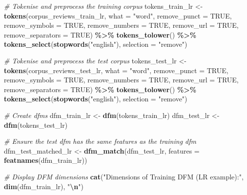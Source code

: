\documentclass[
]{book}
\newenvironment{Shaded}{\begin{snugshade}}{\end{snugshade}}
\newcommand{\AttributeTok}[1]{\textcolor[rgb]{0.13,0.29,0.53}{#1}}
\newcommand{\CommentTok}[1]{\textcolor[rgb]{0.56,0.35,0.01}{\textit{#1}}}
\newcommand{\ConstantTok}[1]{\textcolor[rgb]{0.56,0.35,0.01}{#1}}
\newcommand{\FunctionTok}[1]{\textcolor[rgb]{0.13,0.29,0.53}{\textbf{#1}}}
\newcommand{\NormalTok}[1]{#1}
\newcommand{\OtherTok}[1]{\textcolor[rgb]{0.56,0.35,0.01}{#1}}
\newcommand{\SpecialCharTok}[1]{\textcolor[rgb]{0.81,0.36,0.00}{\textbf{#1}}}
\newcommand{\StringTok}[1]{\textcolor[rgb]{0.31,0.60,0.02}{#1}}
\begin{document}
\begin{Shaded}
\begin{Highlighting}[]
\CommentTok{\# Tokenise and preprocess the training corpus}
\NormalTok{tokens\_train\_lr }\OtherTok{\textless{}{-}} \FunctionTok{tokens}\NormalTok{(corpus\_reviews\_train\_lr, }\AttributeTok{what =} \StringTok{"word"}\NormalTok{, }\AttributeTok{remove\_punct =} \ConstantTok{TRUE}\NormalTok{,}
    \AttributeTok{remove\_symbols =} \ConstantTok{TRUE}\NormalTok{, }\AttributeTok{remove\_numbers =} \ConstantTok{TRUE}\NormalTok{, }\AttributeTok{remove\_url =} \ConstantTok{TRUE}\NormalTok{, }\AttributeTok{remove\_separators =} \ConstantTok{TRUE}\NormalTok{) }\SpecialCharTok{\%\textgreater{}\%}
    \FunctionTok{tokens\_tolower}\NormalTok{() }\SpecialCharTok{\%\textgreater{}\%}
    \FunctionTok{tokens\_select}\NormalTok{(}\FunctionTok{stopwords}\NormalTok{(}\StringTok{"english"}\NormalTok{), }\AttributeTok{selection =} \StringTok{"remove"}\NormalTok{)}

\CommentTok{\# Tokenise and preprocess the test corpus}
\NormalTok{tokens\_test\_lr }\OtherTok{\textless{}{-}} \FunctionTok{tokens}\NormalTok{(corpus\_reviews\_test\_lr, }\AttributeTok{what =} \StringTok{"word"}\NormalTok{, }\AttributeTok{remove\_punct =} \ConstantTok{TRUE}\NormalTok{,}
    \AttributeTok{remove\_symbols =} \ConstantTok{TRUE}\NormalTok{, }\AttributeTok{remove\_numbers =} \ConstantTok{TRUE}\NormalTok{, }\AttributeTok{remove\_url =} \ConstantTok{TRUE}\NormalTok{, }\AttributeTok{remove\_separators =} \ConstantTok{TRUE}\NormalTok{) }\SpecialCharTok{\%\textgreater{}\%}
    \FunctionTok{tokens\_tolower}\NormalTok{() }\SpecialCharTok{\%\textgreater{}\%}
    \FunctionTok{tokens\_select}\NormalTok{(}\FunctionTok{stopwords}\NormalTok{(}\StringTok{"english"}\NormalTok{), }\AttributeTok{selection =} \StringTok{"remove"}\NormalTok{)}

\CommentTok{\# Create dfms}
\NormalTok{dfm\_train\_lr }\OtherTok{\textless{}{-}} \FunctionTok{dfm}\NormalTok{(tokens\_train\_lr)}
\NormalTok{dfm\_test\_lr }\OtherTok{\textless{}{-}} \FunctionTok{dfm}\NormalTok{(tokens\_test\_lr)}

\CommentTok{\# Ensure the test dfm has the same features as the training dfm}
\NormalTok{dfm\_test\_matched\_lr }\OtherTok{\textless{}{-}} \FunctionTok{dfm\_match}\NormalTok{(dfm\_test\_lr, }\AttributeTok{features =} \FunctionTok{featnames}\NormalTok{(dfm\_train\_lr))}

\CommentTok{\# Display DFM dimensions}
\FunctionTok{cat}\NormalTok{(}\StringTok{"Dimensions of Training DFM (LR example):"}\NormalTok{, }\FunctionTok{dim}\NormalTok{(dfm\_train\_lr), }\StringTok{"}\SpecialCharTok{\textbackslash{}n}\StringTok{"}\NormalTok{)}
\end{Highlighting}
\end{Shaded}
\end{document}
